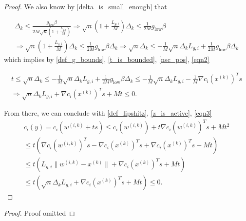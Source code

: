 \documentclass{article}
\theoremstyle{case}
\newcommand{\xk}{{x^{(k)}}}
\newcommand{\dk}{\Delta_k}
\newcommand{\fik}{{\mathcal F_{i, k}}}
\newcommand{\wik}{{w^{(i, k)}}}
\newcommand{\lgi}{{L_{g, i}}}
\begin{document}
\begin{proof}

We also know by \cref{delta_is_small_enough} that
\color{red}


\begin{align}
\dk \le \frac {g_{\text{low}} \beta} {2M\sqrt{n}\left(1 + \frac {\lgi} M \right)} 
\Longrightarrow \sqrt{n}\left(1 + \frac {\lgi} M \right) \dk\le \frac 1 {2M} g_{\text{low}} \beta \nonumber \\
\Longrightarrow \sqrt{n}\left(1 + \frac {\lgi} M \right) \dk \le \frac 1 {2M} g_{\text{low}} \beta \dk
\Longrightarrow \sqrt{n} \dk \le -\frac 1 M \sqrt{n}\dk \lgi + \frac 1 {2M} g_{\text{low}} \beta \dk \label{eqn2}
\end{align}
\color{black}
which implies by \cref{def_g_bounds}, \cref{t_is_bounded}, \cref{nsc_pos}, \cref{eqn2}

\begin{align}
t 
\le \sqrt{n} \dk 
\le -\frac 1 M \sqrt{n}\dk \lgi + \frac 1 {2M} g_{\text{low}} \beta \dk
\le -\frac 1 M \sqrt{n}\dk \lgi -\frac 1 M \nabla c_i(\xk)^Ts \nonumber \\
\Longrightarrow \sqrt{n}\dk \lgi + \nabla c_i(\xk)^Ts + M t \le 0. \label{eqn3}
\end{align}

From there, we can conclude with \cref{def_lipshitz}, \cref{z_is_active}, \cref{eqn3}
\begin{align*}
c_i(y) = c_i(\wik + ts) \le c_i(\wik) + t\nabla c_i(\wik)^Ts + M t^2 \\
\le t \left(\nabla c_i(\wik)^Ts - \nabla c_i(\xk)^Ts + \nabla c_i(\xk)^Ts + M t\right) \\
\le t \left(\lgi\|\wik - \xk\| + \nabla c_i(\xk)^Ts + M t\right) \\
\le t \left(\sqrt{n}\dk \lgi + \nabla c_i(\xk)^Ts + M t\right) \le 0.
\end{align*}



\end{proof}
\else
\begin{proof}
Proof omitted
\end{proof}
\fi
\end{document}
